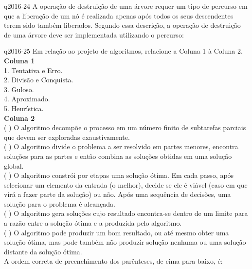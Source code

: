 \documentclass[10pt,a4paper]{article}
\begin{document}
{
\def\AMCbeginQuestion#1#2{\par\noindent{\bf (POSCOMP 2016 - Questão 24)}}
\begin{question}{q2016-24} A operação de destruição de uma árvore requer um tipo de percurso em que a liberação de um nó é realizada apenas após todos os seus descendentes terem sido também liberados. Segundo essa descrição, a operação de destruição de uma árvore deve ser implementada utilizando o percurso:
\begin{choices}
\end{choices}
\end{question}
}

{
\def\AMCbeginQuestion#1#2{\par\noindent{\bf (POSCOMP 2016 - Questão 25)}}
\begin{question}{q2016-25} Em relação ao projeto de algoritmos, relacione a Coluna 1 à Coluna 2.\\
\textbf{Coluna 1}\\
1. Tentativa e Erro.\\
2. Divisão e Conquista.\\
3. Guloso.\\
4. Aproximado.\\
5. Heurística.\\
\textbf{Coluna 2}\\
( ) O algoritmo decompõe o processo em um número finito de subtarefas parciais que devem ser exploradas exaustivamente.\\
( ) O algoritmo divide o problema a ser resolvido em partes menores, encontra soluções para as partes e então combina as soluções obtidas em uma solução global.\\
( ) O algoritmo constrói por etapas uma solução ótima. Em cada passo, após selecionar um elemento da entrada (o melhor), decide se ele é viável (caso em que virá a fazer parte da solução) ou não. Após uma sequência de decisões, uma solução para o problema é alcançada.\\
( ) O algoritmo gera soluções cujo resultado encontra-se dentro de um limite para a razão entre a solução ótima e a produzida pelo algoritmo.\\
( ) O algoritmo pode produzir um bom resultado, ou até mesmo obter uma solução ótima, mas pode também não produzir solução nenhuma ou uma solução distante da solução ótima.\\
A ordem correta de preenchimento dos parênteses, de cima para baixo, é:
\begin{choices}
\end{choices}
\end{question}
}
\end{document}
